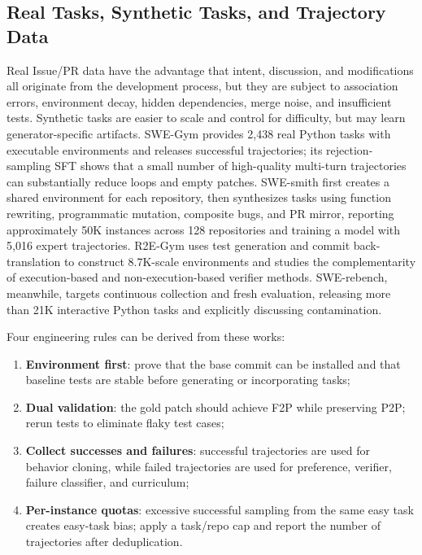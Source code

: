 \documentclass[10pt,a4paper,UTF8,fontset=none]{ctexart}
\begin{document}
\subsection{Real Tasks, Synthetic Tasks, and Trajectory Data}

Real Issue/PR data have the advantage that intent, discussion, and modifications all originate from the development process, but they are subject to association errors, environment decay, hidden dependencies, merge noise, and insufficient tests. Synthetic tasks are easier to scale and control for difficulty, but may learn generator-specific artifacts. SWE-Gym provides 2,438 real Python tasks with executable environments and releases successful trajectories; its rejection-sampling SFT shows that a small number of high-quality multi-turn trajectories can substantially reduce loops and empty patches\cite{pan2024swegym}. SWE-smith first creates a shared environment for each repository, then synthesizes tasks using function rewriting, programmatic mutation, composite bugs, and PR mirror, reporting approximately 50K instances across 128 repositories and training a model with 5,016 expert trajectories\cite{yang2025swesmith}. R2E-Gym uses test generation and commit back-translation to construct 8.7K-scale environments and studies the complementarity of execution-based and non-execution-based verifier methods\cite{jain2025r2egym}. SWE-rebench, meanwhile, targets continuous collection and fresh evaluation, releasing more than 21K interactive Python tasks and explicitly discussing contamination\cite{badertdinov2025swerebench}.

Four engineering rules can be derived from these works:

\begin{enumerate}
  \item \textbf{Environment first}: prove that the base commit can be installed and that baseline tests are stable before generating or incorporating tasks;
  \item \textbf{Dual validation}: the gold patch should achieve F2P while preserving P2P; rerun tests to eliminate flaky test cases;
  \item \textbf{Collect successes and failures}: successful trajectories are used for behavior cloning, while failed trajectories are used for preference, verifier, failure classifier, and curriculum;
  \item \textbf{Per-instance quotas}: excessive successful sampling from the same easy task creates easy-task bias; apply a task/repo cap and report the number of trajectories after deduplication.
\end{enumerate}
\end{document}
